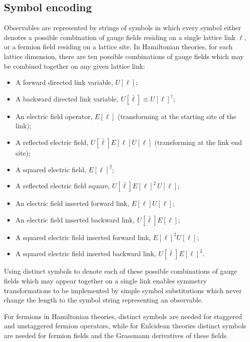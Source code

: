 \documentclass [12pt]{article}
\begin{document}
\subsection {Symbol encoding}\label{sec:symbols}

    Observables are represented by strings of symbols in which every
    symbol either denotes
    a possible combination of gauge fields residing on a single
    lattice link $\ell$, or
    a fermion field residing on a lattice site.
    In Hamiltonian theories,
    for each lattice dimension, there are ten possible
    combinations of gauge fields which may be combined together
    on any given lattice link:
    \begin{itemize}\advance\itemsep -3pt
    \item A forward directed link variable, $U[\ell]$;
    \item A backward directed link variable, $U[\bar\ell] \equiv U[\ell]^\dagger$;
    \item An electric field operator, $E[\ell]$ (transforming at the starting site of the link);
    \item A reflected electric field, $U[\bar\ell] E[\ell] U[\ell]$
	(transforming at the link end site);
    \item A squared electric field, $E[\ell]^2$;
    \item A reflected electric field square,
	$U[\bar\ell] E[\ell]^2 \, U[\ell]$;
    \item An electric field inserted forward link, $E[\ell] U[\ell]$;
    \item An electric field inserted backward link, $U[\bar\ell] E[\ell]$;
    \item A squared electric field inserted forward link, $E[\ell]^2 U[\ell]$;
    \item A squared electric field inserted backward link, $U[\bar\ell] E[\ell]^2$.
    \end{itemize}
    Using distinct symbols to denote each of these possible combinations of
    gauge fields which may appear together on a single link
    enables symmetry transformations to be implemented by simple symbol
    substitutions which never change the length to the symbol string
    representing an observable.

    For fermions in Hamiltonian theories, distinct symbols are needed for 
    staggered and unstaggered fermion operators, while for Eulcidean theories
    distinct symbols are needed for fermion fields and the Grassmann derivatives
    of these fields.
\end{document}
